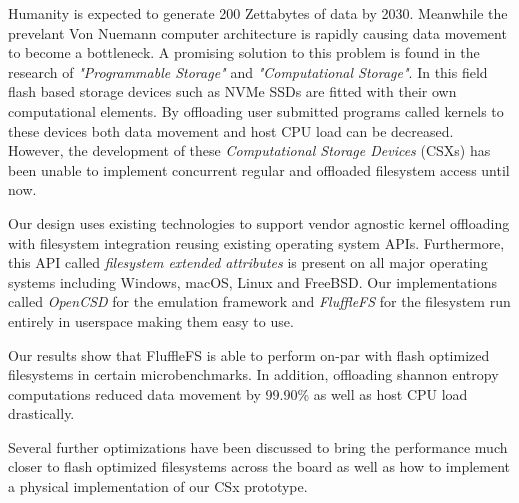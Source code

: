 


\begin{abstracts}

Humanity is expected to generate 200 Zettabytes of data by 2030. Meanwhile the
prevelant Von Nuemann computer architecture is rapidly causing data movement
to become a bottleneck.  A promising solution to this problem is found in the
research of \textit{"Programmable Storage"} and
\textit{"Computational Storage"}. In this field flash based storage devices such
as NVMe SSDs are fitted with their own computational elements. By offloading
user submitted programs called kernels to these devices both data movement
and host CPU load can be decreased. However, the development of these
\textit{Computational Storage Devices} (CSXs) has been unable to implement
concurrent regular and offloaded filesystem access until now.

Our design uses existing technologies to support vendor agnostic kernel
offloading with filesystem integration reusing existing operating system
APIs. Furthermore, this API called \textit{filesystem extended attributes} is
present on all major operating systems including Windows, macOS, Linux and
FreeBSD. Our implementations called \textit{OpenCSD} for the emulation
framework and \textit{FluffleFS} for the filesystem run entirely in userspace
making them easy to use.

Our results show that FluffleFS is able to perform on-par with flash optimized
filesystems in certain microbenchmarks. In addition, offloading shannon
entropy computations reduced data movement by 99.90\% as well as host CPU load
drastically.

Several further optimizations have been discussed to bring the performance much
closer to flash optimized filesystems across the board as well as how to
implement a physical implementation of our CSx prototype.

\end{abstracts}


